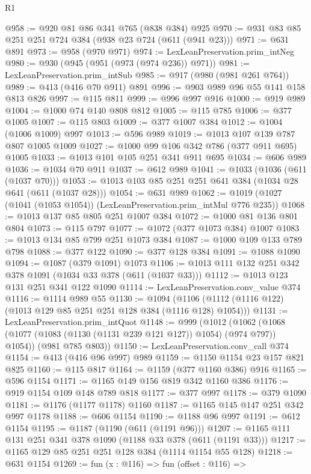 \begin{lexlean}{R1}
\begin{coremodule}
@958 := @920 @81 @86 @341 @765 (@838 @384) @925
@970 := @931 @83 @85 @251 @251 @724 @384 (@938 @23 @724 (@611 (@941 @23)))
@971 := @631 @891
@973 := @958 (@970 @971)
@974 := LexLeanPreservation.prim_intNeg
@980 := @930 (@945 (@951 (@973 (@974 @236)) @971))
@981 := LexLeanPreservation.prim_intSub
@985 := @917 (@980 (@981 @261 @764))
@989 := @413 (@416 @70 @911) @891
@996 := @903 @989 @96 @55 @141 @158 @813 @826
@997 := @115 @811
@999 := @996 @997 @916
@1000 := @919 @989
@1004 := @1000 @74 @140 @808 @812
@1005 := @115 @785
@1006 := @377 @1005
@1007 := @115 @803
@1009 := @377 @1007 @384
@1012 := @1004 (@1006 @1009) @997
@1013 := @596 @989
@1019 := @1013 @107 @139 @787 @807 @1005 @1009
@1027 := @1000 @99 @106 @342 @786 (@377 @911 @695) @1005
@1033 := @1013 @101 @105 @251 @341 @911 @695
@1034 := @606 @989
@1036 := @1034 @70 @911
@1037 := @612 @989
@1041 := @1033 (@1036 (@611 (@1037 @70)))
@1053 := @1013 @103 @85 @251 @251 @641 @384 (@1034 @28 @641 (@611 (@1037 @28)))
@1054 := @631 @989
@1062 := @1019 (@1027 (@1041 (@1053 @1054)) (LexLeanPreservation.prim_intMul @776 @235))
@1068 := @1013 @137 @85 @805 @251 @1007 @384
@1072 := @1000 @81 @136 @801 @804
@1073 := @115 @797
@1077 := @1072 (@377 @1073 @384) @1007
@1083 := @1013 @134 @85 @799 @251 @1073 @384
@1087 := @1000 @109 @133 @789 @798
@1088 := @377 @122
@1090 := @377 @128 @384
@1091 := @1088 @1090
@1094 := @1087 (@379 @1091) @1073
@1106 := @1013 @111 @132 @251 @342 @378 @1091 (@1034 @33 @378 (@611 (@1037 @33)))
@1112 := @1013 @123 @131 @251 @341 @122 @1090
@1114 := LexLeanPreservation.conv_value @374
@1116 := @1114 @989 @55
@1130 := @1094 (@1106 (@1112 (@1116 @122) (@1013 @129 @85 @251 @251 @128 @384 (@1116 @128) @1054)))
@1131 := LexLeanPreservation.prim_intQuot
@1148 := @999
    (@1012
      (@1062 (@1068 (@1077 (@1083 (@1130 (@1131 @239 @121 @127)) @1054) (@974 @797)) @1054))
      (@981 @785 @803))
@1150 := LexLeanPreservation.conv_call @374
@1154 := @413 (@416 @96 @997) @989
@1159 := @1150 @1154 @23 @157 @821 @825
@1160 := @115 @817
@1164 := @1159 (@377 @1160 @386) @916
@1165 := @596 @1154
@1171 := @1165 @149 @156 @819 @342 @1160 @386
@1176 := @919 @1154 @109 @148 @789 @818
@1177 := @377 @997
@1178 := @379 @1090
@1181 := @1176 (@1177 @1178) @1160
@1187 := @1165 @145 @147 @251 @342 @997 @1178
@1188 := @606 @1154
@1190 := @1188 @96 @997
@1191 := @612 @1154
@1195 := @1187 (@1190 (@611 (@1191 @96)))
@1207 := @1165 @111 @131 @251 @341 @378 @1090 (@1188 @33 @378 (@611 (@1191 @33)))
@1217 := @1165 @129 @85 @251 @251 @128 @384 (@1114 @1154 @55 @128)
@1218 := @631 @1154
@1269 := fun (x : @116) =>
  fun (offset : @116) =>

\end{coremodule}
\end{lexlean}
